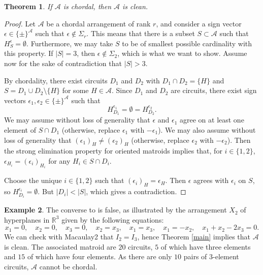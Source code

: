 \documentclass[11pt]{article}
\newtheorem{theorem}{Theorem}[section]
\theoremstyle{definition}
\newtheorem{example}[theorem]{Example}
\newcommand{\R}{{\mathbb{R}}}
\newcommand{\<}{\left<}
\renewcommand{\>}{\right>}
\newcommand{\cA}{\mathcal{A}}
\begin{document}
\begin{theorem}\label{thm:chordal-means-yoshi}
If $\cA$ is chordal, then $\cA$ is clean.
\end{theorem}

\begin{proof}
Let $\cA$ be a chordal arrangement of rank $r$, and consider a sign vector $\epsilon\in\{\pm\}^\cA$ such that $\epsilon\notin\Sigma_r$.
This means that there is a subset $S\subset\cA$ such that $H_S^\epsilon=\emptyset$.  Furthermore, we may take $S$ to be of smallest possible
cardinality with this property.  If $|S| = 3$, then $\epsilon\notin\Sigma_2$, which is what we want to show.  Assume now for the sake of contradiction that $|S|>3$.

By chordality, there exist circuits
$D_1$ and $D_2$ with $D_1 \cap D_2 = \{H\}$ and $S = D_1 \cup D_2 \setminus\{H\}$ for some $H\in \cA$.
Since $D_1$ and $D_2$ are circuits, there exist sign vectors $\epsilon_1,\epsilon_2\in\{\pm\}^\cA$ such that
$$H_{D_1}^{\epsilon_1} = \emptyset = H_{D_2}^{\epsilon_2}.$$
We may assume without loss of generality that $\epsilon$ and $\epsilon_1$ agree on at least one element of $S\cap D_1$
(otherwise, replace $\epsilon_1$ with $-\epsilon_1$).
We may also assume without loss of generality that $(\epsilon_1)_H \neq (\epsilon_2)_H$ (otherwise, replace $\epsilon_2$ with $-\epsilon_2$).
Then the strong elimination property for oriented matroids implies that, for $i\in\{1,2\}$, $\epsilon_{H_i} = (\epsilon_i)_{H_i}$ for any $H_i\in S\cap D_i$.

Choose the unique $i\in\{1,2\}$ such that $(\epsilon_i)_H = \epsilon_H$.  Then $\epsilon$ agrees with $\epsilon_i$ on $S$, so 
$H_{D_i}^{\epsilon_i} = \emptyset$.  But $|D_i|<|S|$, which gives a contradiction.
\end{proof}

\begin{example}\label{ex:x2-arr}
The converse to  is false,
as illustrated by the arrangement $X_2$ of hyperplanes in $\R^3$ given by the following equations:    
    \[
        x_1=0, \quad x_2=0, \quad x_3=0, \quad x_2=x_3, \quad x_1=x_3, \quad x_1= -x_2, \quad x_1+x_2-2x_3=0.
    \]
    We can check with Macaulay2 that $I_2=I_3$, hence Theorem \ref{main} implies that $\cA$ is clean.
    The associated matroid are $20$ circuits, $5$ of which have three elements and $15$ of which have four elements.
    As there are only $10$ pairs of $3$-element circuits, $\cA$ cannot be chordal.
\end{example}
\end{document}
